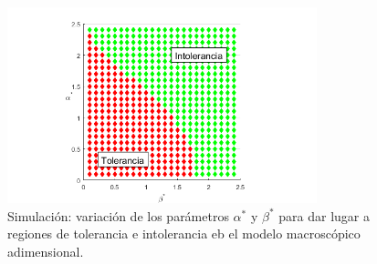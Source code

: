 \begin{figure}[t]
	\centering
	\includegraphics[width=0.8\textwidth]{Imagenes/Simulaciones/macro_toler_intoler}
	\caption{Simulación: variación de los parámetros $\alpha^{*}$ y $\beta^{*}$ para dar lugar a regiones de tolerancia e intolerancia eb el modelo macroscópico adimensional.}
	\label{fig:macro_toler_intoler}
\end{figure}